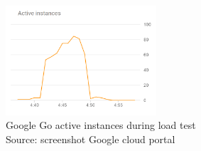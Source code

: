 \begin{figure}[htp]
\begin{center}
\includegraphics[width=0.5\textwidth]{bilder/Google_Go_Instances.png}
\captionsetup{justification=centering, labelfont=bf}
\caption[Google Go active instances during load test]{Google Go active instances during load test\\Source: screenshot Google cloud portal}
\label{fig:google_graph_go}
\end{center}
\end{figure}

